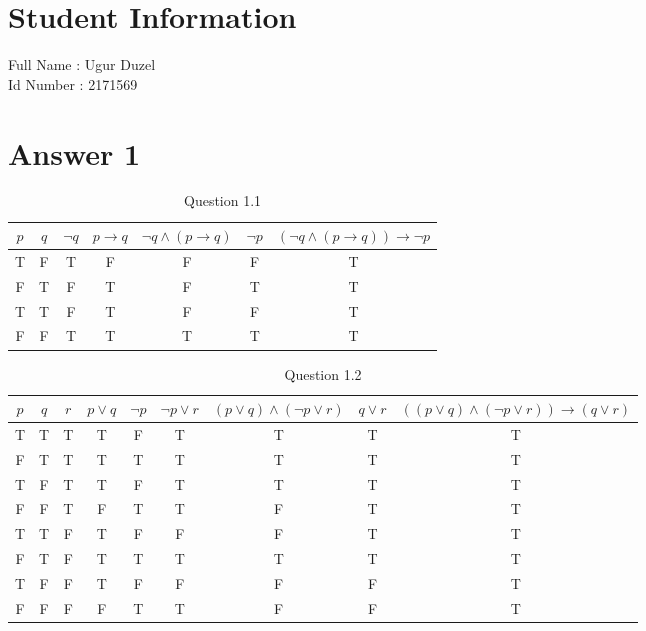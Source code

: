 \documentclass[12pt]{article}
\begin{document}
\section*{Student Information } 
Full Name :  Ugur Duzel \\
Id Number :  2171569 \\


\section*{Answer 1}

\begin{table}[H]
\small
\centering
\caption{ Question 1.1 }
\label{table:1}
\begin{tabular}{|cc|c|c|c|c|c|}	%
\hline 							%
$p$ & 
$q$ & 
$\neg q$ & 
$p \rightarrow q$ & 
$\neg q \land (p \rightarrow q)$ &
$\neg p$ & 
$(\neg q \land (p \rightarrow q)) \rightarrow \neg p$ \\
\hline 
\hline
T&F&T&F&F&F&T\\
\hline
F&T&F&T&F&T&T\\
\hline
T&T&F&T&F&F&T\\
\hline
F&F&T&T&T&T&T\\ 
\hline 

\end{tabular}
\end{table}

\begin{table}[H]
\small
\centering
\caption{Question 1.2}
\label{table:2}
\begin{tabular}{|ccc|c|c|c|c|c|c|}
\hline
$p$ &
$q$ &
$r$ &
$p \lor q$ &
$\neg p$ &
$\neg p \lor r$ &
$(p \lor q) \land (\neg p \lor r)$ &
$q \lor r$ &
$((p \lor q) \land (\neg p \lor r)) \rightarrow (q \lor r)$  \\
\hline
\hline
T&T&T&T&F&T&T&T&T\\
\hline
F&T&T&T&T&T&T&T&T\\
\hline
T&F&T&T&F&T&T&T&T\\
\hline
F&F&T&F&T&T&F&T&T\\
\hline
T&T&F&T&F&F&F&T&T\\
\hline
F&T&F&T&T&T&T&T&T\\
\hline
T&F&F&T&F&F&F&F&T\\
\hline
F&F&F&F&T&T&F&F&T\\
\hline
\end{tabular}
\end{table}
\end{document}
